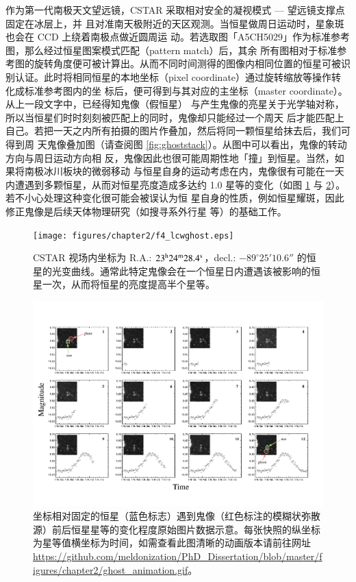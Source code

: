 作为第一代南极天文望远镜，CSTAR 采取相对安全的凝视模式 --- 望远镜支撑点固定在冰层上，并
且对准南天极附近的天区观测。当恒星做周日运动时，星象斑也会在 CCD 上绕着南极点做近圆周运
动。若选取图「A5CH5029」作为标准参考图，那么经过恒星图案模式匹配（pattern match）后，其余
所有图相对于标准参考图的旋转角度便可被计算出。从而不同时间测得的图像内相同位置的恒星可被识
别认证。此时将相同恒星的本地坐标（pixel coordinate）通过旋转缩放等操作转化成标准参考图内的坐
标后，便可得到与其对应的主坐标（master coordinate）。从上一段文字中，已经得知鬼像（假恒星）
与产生鬼像的亮星关于光学轴对称，所以当恒星们时时刻刻被匹配上的同时，鬼像却只能经过一个周天
后才能匹配上自己。若把一天之内所有拍摄的图片作叠加，然后将同一颗恒星给抹去后，我们可得到周
天鬼像叠加图（请查阅图 \ref{fig:ghoststack}）。从图中可以看出，鬼像的转动方向与周日运动方向相
反，鬼像因此也很可能周期性地「撞」到恒星。当然，如果将南极冰川板块的微弱移动\cite{ZhouX2013}
与恒星自身的运动考虑在内，鬼像很有可能在一天内遭遇到多颗恒星，从而对恒星亮度造成多达约 1.0 
星等的变化（如图 \ref{fig:lcwghost} 与 \ref{fig:ghostseq}）。若不小心处理这种变化很可能会被误认为恒
星自身的性质，例如恒星耀斑\cite{Liang2016}，因此修正鬼像是后续天体物理研究（如搜寻系外行星
\cite{Wang2014CSTAR} 等）的基础工作。

\begin{figure}[t]
\centering
\texttt{[image: figures/chapter2/f4\_lcwghost.eps]}
\caption{CSTAR 视场内坐标为 R.A.: $23^\mathrm{h}24^\mathrm{m}28.4^\mathrm{s}$，decl.: $-89^{\circ}25'10.6''$ 的恒星的光变曲线。通常此特定鬼像会在一个恒星日内遭遇该被影响的恒星一次，从而将恒星的亮度提高半个星等。}
\label{fig:lcwghost}
\end{figure}

\begin{figure}
\centering
\includegraphics[scale=0.8]{figures/chapter2/f5_ghostseq.pdf}
\caption[坐标相对固定的恒星（蓝色标志）遇到鬼像（红色标注的模糊状弥散源）前后恒星星等的变化程度原始图片数据示意。]{坐标相对固定的恒星（蓝色标志）遇到鬼像（红色标注的模糊状弥散源）前后恒星星等的变化程度原始图片数据示意。每张快照的纵坐标为星等值横坐标为时间，如需查看此图清晰的动画版本请前往网址 \url{https://github.com/meldonization/PhD_Dissertation/blob/master/figures/chapter2/ghost_animation.gif}。}
\label{fig:ghostseq}
\end{figure}


